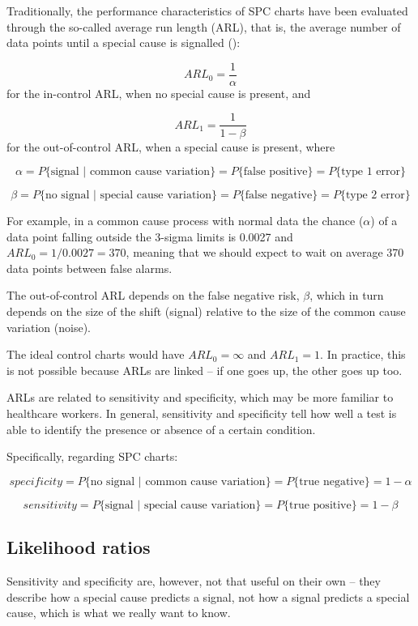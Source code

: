 \documentclass[
]{book}
\begin{document}
Traditionally, the performance characteristics of SPC charts have been evaluated through the so-called average run length (ARL), that is, the average number of data points until a special cause is signalled ():

\[ ARL_0=\frac{1}{\alpha} \]
for the in-control ARL, when no special cause is present, and

\[ ARL_1=\frac{1}{1-\beta} \]
for the out-of-control ARL, when a special cause is present, where

\[ \alpha=P\{\text{signal | common cause variation}\}=P\{\text{false positive}\}=P\{\text{type 1 error}\} \]

\[ \beta=P\{\text{no signal | special cause variation}\}=P\{\text{false negative}\}=P\{\text{type 2 error}\} \]

For example, in a common cause process with normal data the chance (\(\alpha\)) of a data point falling outside the 3-sigma limits is 0.0027 and \(ARL_0=1/0.0027=370\), meaning that we should expect to wait on average 370 data points between false alarms.

The out-of-control ARL depends on the false negative risk, \(\beta\), which in turn depends on the size of the shift (signal) relative to the size of the common cause variation (noise).

The ideal control charts would have \(ARL_0=\infty\) and \(ARL_1=1\). In practice, this is not possible because ARLs are linked -- if one goes up, the other goes up too.

ARLs are related to sensitivity and specificity, which may be more familiar to healthcare workers. In general, sensitivity and specificity tell how well a test is able to identify the presence or absence of a certain condition.

Specifically, regarding SPC charts:

\[ specificity=P\{\text{no signal | common cause variation}\}=P\{\text{true negative}\}=1-\alpha \]

\[ sensitivity=P\{\text{signal | special cause variation}\}=P\{\text{true positive}\}=1-\beta \]

\subsection{Likelihood ratios}\label{likelihood-ratios}

Sensitivity and specificity are, however, not that useful on their own -- they describe how a special cause predicts a signal, not how a signal predicts a special cause, which is what we really want to know.
\end{document}
